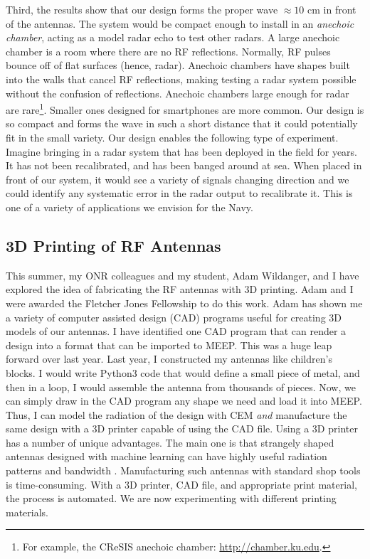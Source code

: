\documentclass[../../../main.tex]{subfiles}
\begin{document}
Third, the results show that our design forms the proper wave $\approx 10$ cm in front of the antennas.  The system would be compact enough to install in an \textit{anechoic chamber}, acting as a model radar echo to test other radars.  A large anechoic chamber is a room where there are no RF reflections.  Normally, RF pulses bounce off of flat surfaces (hence, radar).  Anechoic chambers have shapes built into the walls that cancel RF reflections, making testing a radar system possible without the confusion of reflections.  Anechoic chambers large enough for radar are rare\footnote{For example, the CReSIS anechoic chamber: \url{http://chamber.ku.edu}.}.  Smaller ones designed for smartphones are more common.  Our design is so compact and forms the wave in such a short distance that it could potentially fit in the small variety.  Our design enables the following type of experiment. Imagine bringing in a radar system that has been deployed in the field for years.  It has not been recalibrated, and has been banged around at sea.  When placed in front of our system, it would see a variety of signals changing direction and we could identify any systematic error in the radar output to recalibrate it.  This is one of a variety of applications we envision for the Navy.

\subsection{3D Printing of RF Antennas}
\label{sec:3d_printer}

This summer, my ONR colleagues and my student, Adam Wildanger, and I have explored the idea of fabricating the RF antennas with 3D printing.  Adam and I were awarded the Fletcher Jones Fellowship to do this work.  Adam has shown me a variety of computer assisted design (CAD) programs useful for creating 3D models of our antennas.  I have identified one CAD program that can render a design into a format that can be imported to MEEP.  This was a huge leap forward over last year.  Last year, I constructed my antennas like children's blocks.  I would write Python3 code that would define a small piece of metal, and then in a loop, I would assemble the antenna from thousands of pieces.  Now, we can simply draw in the CAD program any shape we need and load it into MEEP.  Thus, I can model the radiation of the design with CEM \textit{and} manufacture the same design with a 3D printer capable of using the CAD file.  Using a 3D printer has a number of unique advantages.  The main one is that strangely shaped antennas designed with machine learning can have highly useful radiation patterns and bandwidth \cite{10.3390/electronics10121377} \cite{10.1109/access.2019.2932912}.  Manufacturing such antennas with standard shop tools is time-consuming.  With a 3D printer, CAD file, and appropriate print material, the process is automated.  We are now experimenting with different printing materials.
\end{document}
